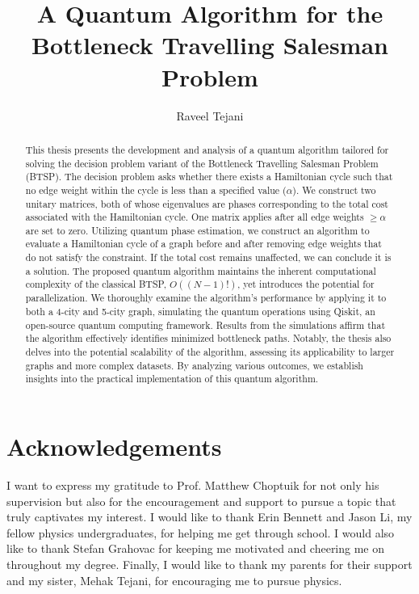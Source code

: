 \documentclass[msc,oneside]{ubcthesis}
\title{A Quantum Algorithm for the Bottleneck Travelling Salesman Problem}
\author{Raveel Tejani}
\begin{document}
	
	
	\frontmatter

	\maketitle               
	

	\clearpage
	\begin{abstract}
		
		This thesis presents the development and analysis of a quantum algorithm tailored for solving the decision problem variant of the Bottleneck Travelling Salesman Problem (BTSP). The decision problem asks whether there exists a Hamiltonian cycle such that no edge weight within the cycle is less than a specified value ($\alpha$). We construct two unitary matrices, both of whose eigenvalues are phases corresponding to the total cost associated with the Hamiltonian cycle. One matrix applies after all edge weights $\geq \alpha$ are set to zero. Utilizing quantum phase estimation, we construct an algorithm to evaluate a Hamiltonian cycle of a graph before and after removing edge weights that do not satisfy the constraint. If the total cost remains unaffected, we can conclude it is a solution. The proposed quantum algorithm maintains the inherent computational complexity of the classical BTSP, $O((N-1)!)$, yet introduces the potential for parallelization. We thoroughly examine the algorithm's performance by applying it to both a 4-city and 5-city graph, simulating the quantum operations using Qiskit, an open-source quantum computing framework. Results from the simulations affirm that the algorithm effectively identifies minimized bottleneck paths. Notably, the thesis also delves into the potential scalability of the algorithm, assessing its applicability to larger graphs and more complex datasets. By analyzing various outcomes, we establish insights into the practical implementation of this quantum algorithm.
		
		
	\end{abstract}
	
	
	\tableofcontents 
	\listoftables             
	\listoffigures           

	
	\chapter{Acknowledgements} 
	
	
I want to express my gratitude to Prof. Matthew Choptuik for not only his supervision but also for the encouragement and support to pursue a topic that truly captivates my interest. I would like to thank Erin Bennett and Jason Li, my fellow physics undergraduates, for helping me get through school. I would also like to thank Stefan Grahovac for keeping me motivated and cheering me on throughout my degree. Finally, I would like to thank my parents for their support and my sister, Mehak Tejani, for encouraging me to pursue physics.
	
\end{document}
